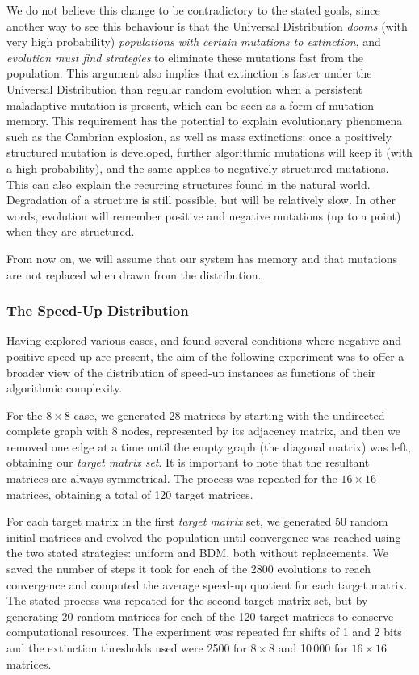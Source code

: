 \documentclass[10pt]{article}
\begin{document}
We do not believe this change to be contradictory to the stated goals, since 
another way to see this behaviour is that the Universal Distribution \textit{dooms} (with very high probability) \textit{populations with certain mutations to extinction}, and \textit{evolution must find strategies} to eliminate these mutations fast from the population. This argument also implies that extinction is faster under the Universal Distribution than regular random evolution when a persistent maladaptive mutation is present, which can be seen as a form of mutation memory. This requirement has the potential to explain evolutionary phenomena such as the Cambrian explosion, as well as mass extinctions: once a positively structured mutation is developed, further algorithmic mutations will keep it (with a high
probability), and the same applies to negatively structured
mutations. This can also explain the recurring structures found in the natural world. Degradation of a structure is still possible, but will be relatively slow. In other words, evolution will remember positive and negative mutations (up to a point) when they are structured.


From now on, we will assume that our system has memory and that mutations are not replaced when drawn from the distribution.

\subsubsection{The Speed-Up Distribution}\label{distribution}

Having explored various cases, and found several conditions where negative and positive speed-up are present, the aim of the following experiment was to offer a broader view of the distribution of speed-up instances as functions of their algorithmic complexity.

For the $8{}\times{}8$ case, we generated 28 matrices by starting with the undirected complete graph with 8 nodes, represented by its adjacency matrix, and then we removed one edge at a time until the empty graph (the diagonal matrix) was left, obtaining
our \textit{target matrix set}. It is important to note that the
resultant matrices are always symmetrical. The process was repeated
for the $16\times{}16$ matrices, obtaining a total of 120 target matrices.

For each target matrix in the first \textit{target matrix} set, we generated 50 random initial matrices and evolved the population until convergence was reached using the two stated strategies: uniform and BDM, both without replacements. We saved the number of steps it took for each of the 2800 evolutions to reach convergence and computed the average speed-up quotient for each target matrix. The stated process was repeated for the second target matrix set, but by generating 20 random matrices for each of the 120 target matrices to conserve computational resources. The experiment was repeated for shifts of 1 and 2 bits and the extinction thresholds used were 2500 for \(8 \times 8\) and 10\,000 for \(16 \times 16\) matrices.
\end{document}
